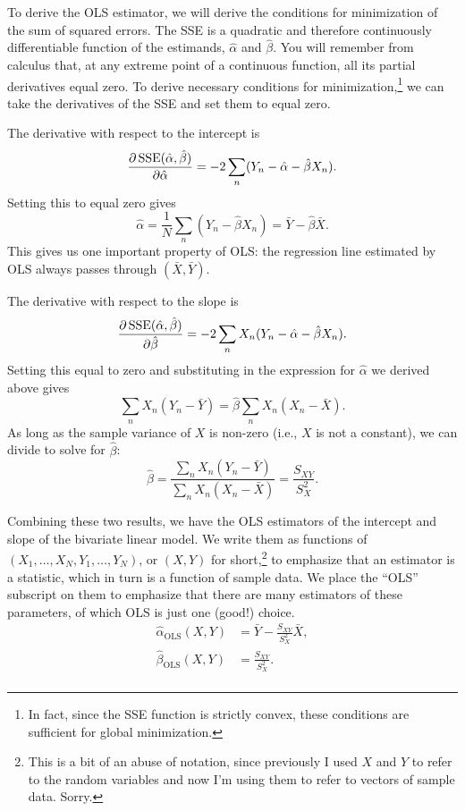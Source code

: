\documentclass[
  12pt,
  oneside,openany]{book}
\begin{document}
To derive the OLS estimator, we will derive the conditions for minimization of the sum of squared errors. The SSE is a quadratic and therefore continuously differentiable function of the estimands, \(\hat{\alpha}\) and \(\hat{\beta}\). You will remember from calculus that, at any extreme point of a continuous function, all its partial derivatives equal zero. To derive necessary conditions for minimization,\footnote{In fact, since the SSE function is strictly convex, these conditions are sufficient for global minimization.} we can take the derivatives of the SSE and set them to equal zero.

The derivative with respect to the intercept is
\[
\frac{\partial{}\mathop{\rm SSE}\nolimits(\hat{\alpha}, \hat{\beta})}{\partial{}\hat{\alpha}}
= -2 \sum_n (Y_n - \hat{\alpha} - \hat{\beta} X_n).
\]
Setting this to equal zero gives
\[
\hat{\alpha}
= \frac{1}{N} \sum_n (Y_n - \hat{\beta} X_n)
= \bar{Y} - \hat{\beta} \bar{X}.
\]
This gives us one important property of OLS: the regression line estimated by OLS always passes through \((\bar{X}, \bar{Y})\).

The derivative with respect to the slope is
\[
\frac{\partial{}\mathop{\rm SSE}\nolimits(\hat{\alpha}, \hat{\beta})}{\partial{}\hat{\beta}}
= -2 \sum_n X_n (Y_n - \hat{\alpha} - \hat{\beta} X_n).
\]
Setting this equal to zero and substituting in the expression for \(\hat{\alpha}\) we derived above gives
\[
\sum_n X_n (Y_n - \bar{Y}) = \hat{\beta} \sum_n X_n (X_n - \bar{X}).
\]
As long as the sample variance of \(X\) is non-zero (i.e., \(X\) is not a constant), we can divide to solve for \(\hat{\beta}\):
\[
\hat{\beta}
= \frac{\sum_n X_n (Y_n - \bar{Y})}{\sum_n X_n (X_n - \bar{X})}
= \frac{S_{XY}}{S_X^2}.
\]

Combining these two results, we have the OLS estimators of the intercept and slope of the bivariate linear model. We write them as functions of \((X_1, \ldots, X_N, Y_1, \ldots, Y_N)\), or \((X, Y)\) for short,\footnote{This is a bit of an abuse of notation, since previously I used \(X\) and \(Y\) to refer to the random variables and now I'm using them to refer to vectors of sample data. Sorry.} to emphasize that an estimator is a statistic, which in turn is a function of sample data. We place the ``OLS'' subscript on them to emphasize that there are many estimators of these parameters, of which OLS is just one (good!) choice.
\[
\begin{aligned}
\hat{\alpha}_{\text{OLS}}(X, Y)
&= \bar{Y} - \frac{S_{XY}}{S_X^2} \bar{X}, \\
\hat{\beta}_{\text{OLS}}(X, Y)
&= \frac{S_{XY}}{S_X^2}. \\
\end{aligned}
\]
\end{document}
